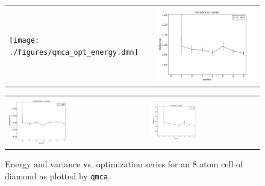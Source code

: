 \begin{figure}
  \centering
  \ifdefined\HCode%
  \begin{tabularx}{1024pt}{X X}
    \texttt{[image: ./figures/qmca\_opt\_energy.dmn]}&
    \includegraphics[trim=2mm 0mm 4mm 0mm,clip,width=512pt]{./figures/qmca_opt_variance.png}\\
  \end{tabularx}
\else%
  \begin{tabularx}{\textwidth}{X X}
    \includegraphics[trim=0mm 0mm 4mm 0mm,clip,width=0.47\textwidth]{./figures/qmca_opt_energy.pdf}&
    \includegraphics[trim=2mm 0mm 4mm 0mm,clip,width=0.47\textwidth]{./figures/qmca_opt_variance.png}\\
    \end{tabularx}
\fi%
  \caption{Energy and variance vs. optimization series for an 8 atom cell of diamond as plotted by \texttt{qmca}.}%
  \label{fig:qmca_opt_ev}%
\end{figure}

